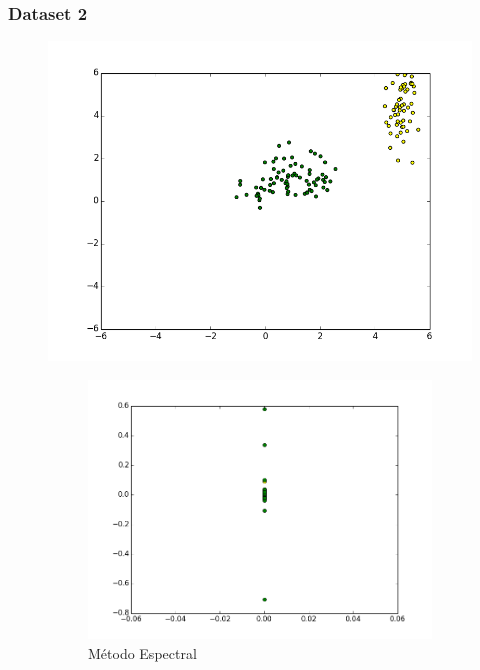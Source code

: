 \documentclass[a4paper,12pt]{article}    %
\begin{document}
\subsubsection{Dataset 2}
\begin{figure}[!ht]
	\centering
	\includegraphics[width=\linewidth]{img/4dataset.png}
	\caption*{N=150, cov1=[[0.1, 1], [0, 2]], cov2=[[0.9, 0.2], [0.2, 0.3]], mean1=[5, 5]}
	\begin{subfigure}{.45\textwidth}
		\centering
		\includegraphics[width=\linewidth]{img/5spectral.png}
		\caption{Método Espectral}
	\end{subfigure}
	\begin{subfigure}{.45\textwidth}
		\centering

\end{subfigure}
\end{figure}
\end{document}
